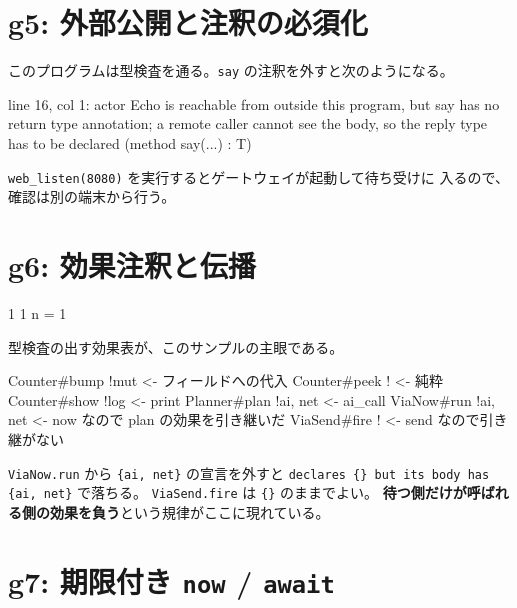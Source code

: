 \documentclass[11pt,a4paper]{ltjsarticle}
\newcommand{\eff}[1]{\texttt{\{#1\}}}
\begin{document}
\section{g5: 外部公開と注釈の必須化}



このプログラムは型検査を通る。\texttt{say} の注釈を外すと次のようになる。

\begin{term}
 line 16, col 1: actor Echo is reachable from outside this
  program, but say has no return type annotation; a remote caller cannot
  see the body, so the reply type has to be declared (method say(...) : T)
\end{term}

\texttt{web\_listen(8080)} を実行するとゲートウェイが起動して待ち受けに
入るので、確認は別の端末から行う。


\section{g6: 効果注釈と伝播}



\begin{term}
1
1
n = 1
\end{term}

型検査の出す効果表が、このサンプルの主眼である。

\begin{term}
  Counter#bump !{mut}          <- フィールドへの代入
  Counter#peek !{}             <- 純粋
  Counter#show !{log}          <- print
  Planner#plan !{ai, net}      <- ai_call
  ViaNow#run   !{ai, net}      <- now なので plan の効果を引き継いだ
  ViaSend#fire !{}             <- send なので引き継がない
\end{term}

\texttt{ViaNow.run} から \eff{ai, net} の宣言を外すと
\texttt{declares \{\} but its body has \{ai, net\}} で落ちる。
\texttt{ViaSend.fire} は \eff{} のままでよい。
\textbf{待つ側だけが呼ばれる側の効果を負う}という規律がここに現れている。

\section{g7: 期限付き \texttt{now} / \texttt{await}}
\end{document}
